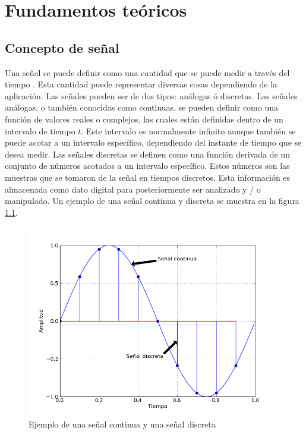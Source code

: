 \chapter{Fundamentos te\'oricos}


\section{Concepto de se\~nal}

Una se\~nal se puede definir como una cantidad que se puede medir a trav\'es del
tiempo \cite{sklar}. Esta cantidad puede representar diversas cosas dependiendo de la
aplicaci\'on. Las se\~nales pueden ser de dos tipos: an\'alogas \'o discretas.
Las se\~nales an\'alogas, o tambi\'en conocidas como continuas, se pueden
definir como una funci\'on de valores reales o complejos, las cuales est\'an
definidas dentro de un intervalo de tiempo $t$. Este intervalo es normalmente 
infinito aunque tambi\'en se puede acotar a un intervalo espec\'ifico, dependiendo del instante de tiempo que se desea medir. 
Las se\~nales discretas se definen como una funci\'on derivada de un conjunto de 
n\'umeros acotados a un intervalo espec\'ifico. Estos n\'umeros son las muestras
que se tomaron de la se\~nal en tiempos discretos. Esta informaci\'on es
almacenada como dato digital para posteriormente ser analizado y / o manipulado.
Un ejemplo de una se\~nal continua y discreta se muestra en la figura
\ref{fig:sine}.

\begin{figure}[ht]
\centering
	\includegraphics[width=5in]{figs/sine}
	\caption{Ejemplo de una se\~nal continua y una se\~nal discreta}
	\label{fig:sine}
\end{figure}


